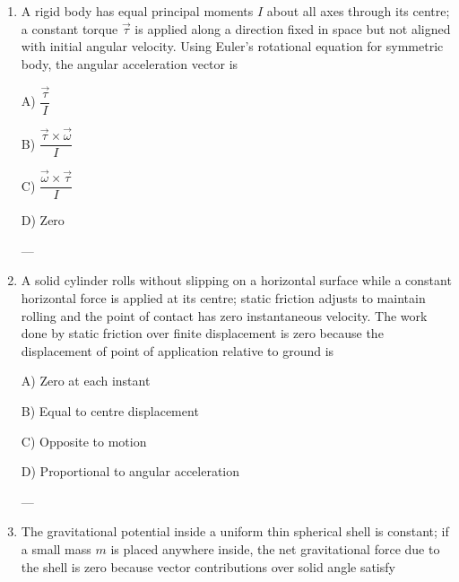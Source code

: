 \documentclass[12pt]{article}
\begin{document}
\begin{enumerate}[leftmargin=*]

A) \(\omega_0\frac{M}{M+m}\)  

B) \(\omega_0\frac{M}{M+2m}\)  

C) \(\omega_0\frac{M+m}{M}\)  

D) \(\omega_0\frac{M}{M+\frac{m}{2}}\)  

---

\item A rigid body has equal principal moments \(I\) about all axes through its centre; a constant torque \(\vec{\tau}\) is applied along a direction fixed in space but not aligned with initial angular velocity. Using Euler’s rotational equation for symmetric body, the angular acceleration vector is  

A) \(\dfrac{\vec{\tau}}{I}\)  

B) \(\dfrac{\vec{\tau}\times\vec{\omega}}{I}\)  

C) \(\dfrac{\vec{\omega}\times\vec{\tau}}{I}\)  

D) Zero  

---

\item A solid cylinder rolls without slipping on a horizontal surface while a constant horizontal force is applied at its centre; static friction adjusts to maintain rolling and the point of contact has zero instantaneous velocity. The work done by static friction over finite displacement is zero because the displacement of point of application relative to ground is  

A) Zero at each instant  

B) Equal to centre displacement  

C) Opposite to motion  

D) Proportional to angular acceleration  

---

\item The gravitational potential inside a uniform thin spherical shell is constant; if a small mass \(m\) is placed anywhere inside, the net gravitational force due to the shell is zero because vector contributions over solid angle satisfy  


\end{enumerate}
\end{document}

